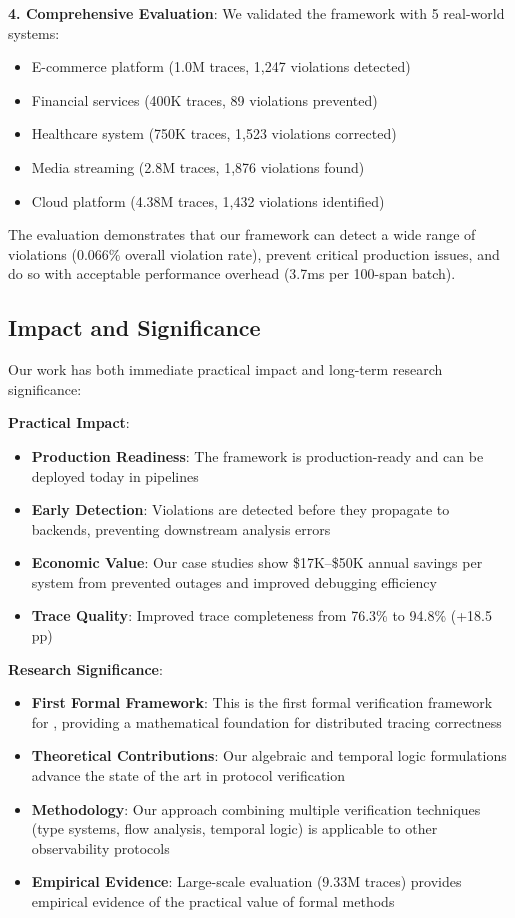 \textbf{4. Comprehensive Evaluation}: We validated the framework with 5 real-world systems:
\begin{itemize}
\item E-commerce platform (1.0M traces, 1,247 violations detected)
\item Financial services (400K traces, 89 violations prevented)
\item Healthcare system (750K traces, 1,523 violations corrected)
\item Media streaming (2.8M traces, 1,876 violations found)
\item Cloud platform (4.38M traces, 1,432 violations identified)
\end{itemize}

The evaluation demonstrates that our framework can detect a wide range of violations (0.066\% overall violation rate), prevent critical production issues, and do so with acceptable performance overhead (3.7ms per 100-span batch).

\subsection{Impact and Significance}

Our work has both immediate practical impact and long-term research significance:

\textbf{Practical Impact}:
\begin{itemize}
\item \textbf{Production Readiness}: The framework is production-ready and can be deployed today in \otel pipelines
\item \textbf{Early Detection}: Violations are detected before they propagate to backends, preventing downstream analysis errors
\item \textbf{Economic Value}: Our case studies show \$17K--\$50K annual savings per system from prevented outages and improved debugging efficiency
\item \textbf{Trace Quality}: Improved trace completeness from 76.3\% to 94.8\% (+18.5 pp)
\end{itemize}

\textbf{Research Significance}:
\begin{itemize}
\item \textbf{First Formal Framework}: This is the first formal verification framework for \otlp, providing a mathematical foundation for distributed tracing correctness
\item \textbf{Theoretical Contributions}: Our algebraic and temporal logic formulations advance the state of the art in protocol verification
\item \textbf{Methodology}: Our approach combining multiple verification techniques (type systems, flow analysis, temporal logic) is applicable to other observability protocols
\item \textbf{Empirical Evidence}: Large-scale evaluation (9.33M traces) provides empirical evidence of the practical value of formal methods
\end{itemize}

